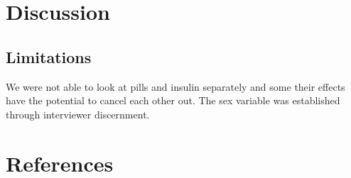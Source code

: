 \documentclass[
  man]{apa6}
\begin{document}
\hypertarget{discussion}{%
\section{Discussion}\label{discussion}}

\hypertarget{limitations}{%
\subsection{Limitations}\label{limitations}}

We were not able to look at pills and insulin separately and some their effects have the potential to cancel each other out. The sex variable was established through interviewer discernment.

\hypertarget{references}{%
\section{References}\label{references}}
\end{document}
